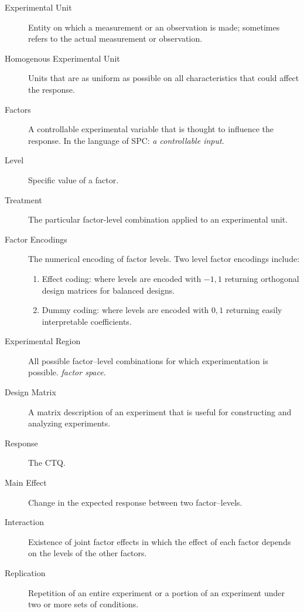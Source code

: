 \begin{description}

\item [Experimental Unit]  Entity on which a measurement or an observation is made;
sometimes refers to the actual measurement or observation.
\item [Homogenous Experimental Unit] Units that are as uniform as possible on all characteristics that could affect the response.

\item [Factors]  A controllable experimental variable that is thought to influence the response. In the language of SPC: \emph{a controllable input}.

\item [Level] Specific value of a factor.

\item[Treatment] The particular factor-level combination applied to an experimental unit.

\item [Factor Encodings] The numerical encoding of factor levels.
Two level factor encodings include:
\begin{enumerate}
\item Effect coding: where levels are encoded with $-1,1$ returning orthogonal design matrices for balanced designs.
\item Dummy coding: where levels are encoded with $0,1$ returning easily interpretable coefficients.
\end{enumerate}

\item [Experimental Region] All possible factor–level combinations for which experimentation is possible. \Aka \emph{factor space}.

\item [Design Matrix] A matrix description of an experiment that is useful for constructing and analyzing experiments.

\item [Response] The CTQ.

\item [Main Effect] Change in the expected response between two factor–levels.  

\item [Interaction] Existence of joint factor effects in which the effect of each factor depends on the levels of the other factors.

\item [Replication] Repetition of an entire experiment or a portion of an experiment under two or more sets of conditions.


\end{description}
